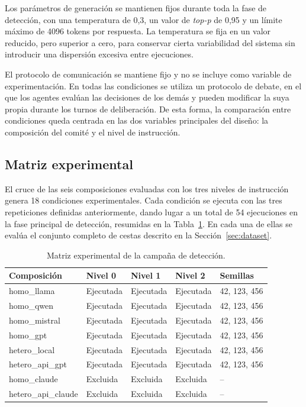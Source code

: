 Los parámetros de generación se mantienen fijos durante toda la fase de detección, con una temperatura de 0,3, un valor de \textit{top-p} de 0,95 y un límite máximo de 4096 tokens por respuesta. La temperatura se fija en un valor reducido, pero superior a cero, para conservar cierta variabilidad del sistema sin introducir una dispersión excesiva entre ejecuciones.

El protocolo de comunicación se mantiene fijo y no se incluye como variable de experimentación. En todas las condiciones se utiliza un protocolo de debate, en el que los agentes evalúan las decisiones de los demás y pueden modificar la suya propia durante los turnos de deliberación. De esta forma, la comparación entre condiciones queda centrada en las dos variables principales del diseño: la composición del comité y el nivel de instrucción.

\subsection{Matriz experimental}
\label{subsec:matriz_experimental}

El cruce de las seis composiciones evaluadas con los tres niveles de instrucción genera 18 condiciones experimentales. Cada condición se ejecuta con las tres repeticiones definidas anteriormente, dando lugar a un total de 54 ejecuciones en la fase principal de detección, resumidas en la Tabla~\ref{tab:matriz_experimental}. En cada una de ellas se evalúa el conjunto completo de cestas descrito en la Sección~\ref{sec:dataset}.

\begin{table}[htbp]
	\centering
	\caption{Matriz experimental de la campaña de detección.}
	\label{tab:matriz_experimental}
	\small
	\begin{tabular}{p{3.0cm} p{2.3cm} p{2.3cm} p{2.3cm} p{2.6cm}}
		\hline
		\textbf{Composición} & \textbf{Nivel 0} & \textbf{Nivel 1} &
		\textbf{Nivel 2} & \textbf{Semillas} \\
		\hline
		
		homo\_llama       & Ejecutada & Ejecutada & Ejecutada & 42, 123, 456 \\
		homo\_qwen        & Ejecutada & Ejecutada & Ejecutada & 42, 123, 456 \\
		homo\_mistral     & Ejecutada & Ejecutada & Ejecutada & 42, 123, 456 \\
		homo\_gpt         & Ejecutada & Ejecutada & Ejecutada & 42, 123, 456 \\
		hetero\_local     & Ejecutada & Ejecutada & Ejecutada & 42, 123, 456 \\
		hetero\_api\_gpt  & Ejecutada & Ejecutada & Ejecutada & 42, 123, 456 \\
		homo\_claude      & Excluida  & Excluida  & Excluida  & -- \\
		hetero\_api\_claude & Excluida & Excluida & Excluida & -- \\
		\hline
	\end{tabular}
\end{table}

